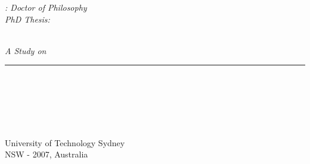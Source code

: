 {
\pagestyle{empty}
\changepage{5cm}{1cm}{-0.5cm}{-0.5cm}{}{-2cm}{}{}{}
\vspace{7mm}


{\small
\noindent 
\textit{\utscoursecode: Doctor of Philosophy}\\
\textit{PhD Thesis: \utsfield}\\
\noindent 
\textit{\DTMenglishmonthname{\utsmonth}~\utsyear}
}

\begin{center}
\par\vspace{6.5cm}

{\begin{minipage}{\textwidth}
\flushright
{
  \emph{\hfill \LARGE{A Study on}\\[.25cm]\HUGE{\utstitle}} 
}
\noindent\rule[-1ex]{\textwidth}{4pt}\\[2.5ex]
\end{minipage}}

\vspace*{4cm}
{\begin{minipage}{\textwidth}
\flushright
{%
{\huge \emph{\utsname}}\\[3ex]} 
\end{minipage}}

\par\vspace {6.5cm}
\end{center}

\noindent%
{\small \utsschool \\ 
\utsfaculty \\
University of Technology Sydney\\
NSW - 2007, Australia}
\clearpage
}

\utsclearemptydoublepage %
